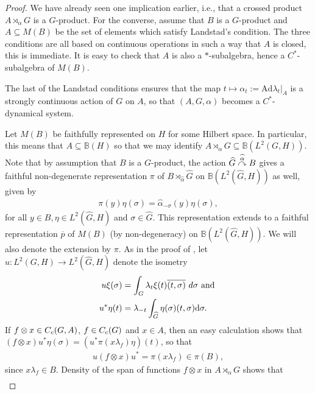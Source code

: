 \begin{proof}
	We have already seen one implication earlier, i.e., that a crossed product $A \rtimes_\alpha G$ is a $G$-product. For the converse, assume that $B$ is a $G$-product and $A \subseteq M(B)$ be the set of elements which satisfy Landstad's condition. The three conditions are all based on continuous operations in such a way that $A$ is closed, this is immediate. It is easy to check that $A$ is also a $*$-subalgebra, hence a $C^*$-subalgebra of $M(B)$. 
	
	The last of the Landstad conditions ensures that the map $t \mapsto \alpha_t := \mathrm{Ad} \lambda_t|_A$ is a strongly continuous action of $G$ on $A$, so that $(A, G, \alpha)$ becomes a $C^*$-dynamical system.
	
	Let $M(B)$ be faithfully represented on $H$ for some Hilbert space. In particular, this means that $A \subseteq \mathbb{B}(H)$ so that we may identify $A \rtimes_\alpha G \subseteq \mathbb{B}(L^2(G,H))$. Note that by assumption that $B$ is a $G$-product, the action $\widehat{G} \stackrel{\widehat{\alpha}}{\curvearrowright} B$ gives a faithful non-degenerate representation $\pi$ of $B \rtimes_{\hat \alpha } \hat G$ on $\mathbb{B}(L^2(\hat G, H))$ as well, given by 
	\begin{align*}
		\pi(y) \eta (\sigma) = \hat \alpha_{-\sigma}(y) \eta (\sigma),	
	\end{align*}
	for all $y \in B, \eta \in L^2(\hat G, H)$ and $\sigma \in \hat G$. This representation extends to a faithful representation $\overline p$ of $M(B)$ (by non-degeneracy) on $\mathbb{B}(L^2(\hat G,H))$. We will also denote the extension by $\pi$. As in the proof of , let $u \colon L^2(G,H) \to L^2(\hat G, H)$ denote the isometry
	\begin{align*}
		u \xi(\sigma) &= \int_G \lambda_t \xi(t) \overline{(t,\sigma)} \ d \sigma \text{ and }\\
		u^* \eta(t) &= \lambda_{-t} \int_{\widehat{G}} \eta(\sigma) (t, \sigma) \mathrm{d} \sigma.
	\end{align*}
	If $f \otimes x \in C_c(G,A)$, $f \in C_c(G)$ and $x \in A$, then an easy calculation shows that $ (f \otimes x) u^* \eta(\sigma) = (u^* \pi(x \lambda_f) \eta)(t)$, so that
	\begin{align}
		u (f \otimes x) u^* = \pi(x \lambda_f) \in \pi(B),
		\label{eq:lands}
	\end{align}
	since $x \lambda_f \in B$. Density of the span of functions $f \otimes x$ in $A \rtimes_\alpha G$ shows that
	\begin{align*}

\end{align*}
\end{proof}

